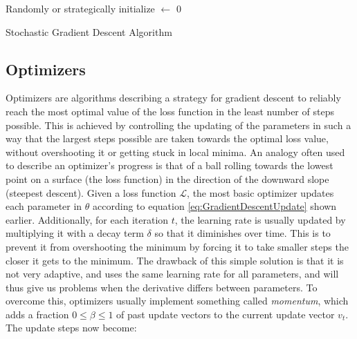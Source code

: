 \begin{algorithm}[H]


\BlankLine
Randomly or strategically initialize \Theta\;
\Iter $\leftarrow$ $0$\;
\Return \Theta\;
\caption{Stochastic Gradient Descent Algorithm}\label{alg:GradientDescent}
\end{algorithm}


\subsection{Optimizers}\label{sec:Optimizer}

Optimizers are algorithms describing a strategy for gradient descent to reliably reach the most optimal value of the loss function in the least number of steps possible. This is achieved by controlling the updating of the parameters in such a way that the largest steps possible are taken towards the optimal loss value, without overshooting it or getting stuck in local minima. An analogy often used to describe an optimizer's progress is that of a ball rolling towards the lowest point on a surface (the loss function) in the direction of the downward slope (steepest descent). Given a loss function $\mathcal{L}$, the most basic optimizer updates each parameter in $\theta$ according to equation \ref{eq:GradientDescentUpdate} shown earlier. Additionally, for each iteration $t$, the learning rate is usually updated by multiplying it with a decay term $\delta$ so that it diminishes over time. This is to prevent it from overshooting the minimum by forcing it to take smaller steps the closer it gets to the minimum. The drawback of this simple solution is that it is not very adaptive, and uses the same learning rate for all parameters, and will thus give us problems when the derivative differs between parameters. To overcome this, optimizers usually implement something called \textit{momentum}, which adds a fraction $0 \leq \beta \leq 1$ of past update vectors to the current update vector $v_t$. The update steps now become:

